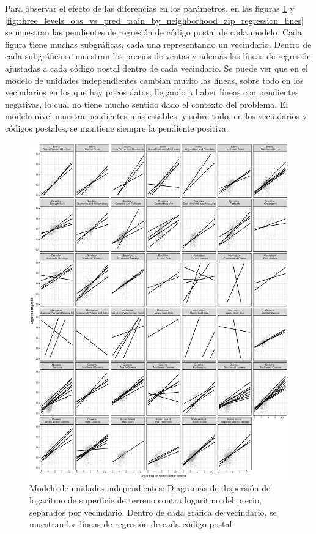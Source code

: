 Para observar el efecto de las diferencias en los parámetros, en las figuras \ref{fig:no_pooling_obs_vs_pred_train_by_neighborhood_zip_regression_lines} y \ref{fig:three_levels_obs_vs_pred_train_by_neighborhood_zip_regression_lines} se muestran las pendientes de regresión de código postal de cada modelo. Cada figura tiene muchas subgráficas, cada una representando un vecindario. Dentro de cada subgráfica se muestran los precios de ventas y además las líneas de regresión ajustadas a cada código postal dentro de cada vecindario. Se puede ver que en el modelo de unidades independientes cambian mucho las líneas, sobre todo en los vecindarios en los que hay pocos datos, llegando a haber líneas con pendientes negativas, lo cual no tiene mucho sentido dado el contexto del problema. El modelo nivel muestra pendientes más estables, y sobre todo, en los vecindarios y códigos postales, se mantiene siempre la pendiente positiva.

\begin{figure}[H]
    \centering
    \includegraphics[width=\textwidth]{images/no_pooling_obs_vs_pred_train_by_neighborhood_zip_regression_lines.pdf}
    \caption{Modelo de unidades independientes: Diagramas de dispersión de logaritmo de superficie de terreno contra logaritmo del precio, separados por vecindario. Dentro de cada gráfica de vecindario, se muestran las líneas de regresión de cada código postal.}
    \label{fig:no_pooling_obs_vs_pred_train_by_neighborhood_zip_regression_lines}
\end{figure}

